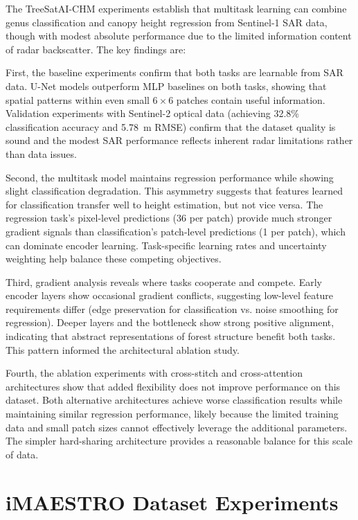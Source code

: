 The TreeSatAI-CHM experiments establish that multitask learning can combine genus classification and canopy height regression from Sentinel-1 SAR data, though with modest absolute performance due to the limited information content of radar backscatter. The key findings are:

First, the baseline experiments confirm that both tasks are learnable from SAR data. U-Net models outperform MLP baselines on both tasks, showing that spatial patterns within even small $6\times 6$ patches contain useful information. Validation experiments with Sentinel-2 optical data (achieving 32.8\% classification accuracy and 5.78~m RMSE) confirm that the dataset quality is sound and the modest SAR performance reflects inherent radar limitations rather than data issues.

Second, the multitask model maintains regression performance while showing slight classification degradation. This asymmetry suggests that features learned for classification transfer well to height estimation, but not vice versa. The regression task's pixel-level predictions (36 per patch) provide much stronger gradient signals than classification's patch-level predictions (1 per patch), which can dominate encoder learning. Task-specific learning rates and uncertainty weighting help balance these competing objectives.

Third, gradient analysis reveals where tasks cooperate and compete. Early encoder layers show occasional gradient conflicts, suggesting low-level feature requirements differ (edge preservation for classification vs. noise smoothing for regression). Deeper layers and the bottleneck show strong positive alignment, indicating that abstract representations of forest structure benefit both tasks. This pattern informed the architectural ablation study.

Fourth, the ablation experiments with cross-stitch and cross-attention architectures show that added flexibility does not improve performance on this dataset. Both alternative architectures achieve worse classification results while maintaining similar regression performance, likely because the limited training data and small patch sizes cannot effectively leverage the additional parameters. The simpler hard-sharing architecture provides a reasonable balance for this scale of data.

\section{iMAESTRO Dataset Experiments}
\label{sec:imaestro_experiments}

